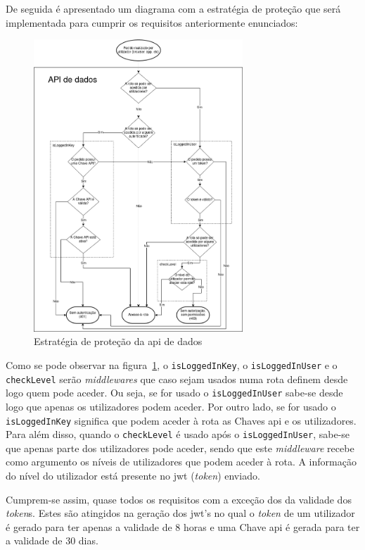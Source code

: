 De seguida é apresentado um diagrama com a estratégia de proteção que será implementada para cumprir os requisitos 
anteriormente enunciados:
\begin{figure}[H]
    \centering
    \includegraphics[width=0.7\textwidth]{img/protecaoStrag.png}
    \caption{Estratégia de proteção da \acrshort{api} de dados}\label{fig:protStrag}
\end{figure}

Como se pode observar na figura~\ref{fig:protStrag}, o \texttt{isLoggedInKey}, o \texttt{isLoggedInUser} e o \texttt{checkLevel} serão \textit{middlewares} que caso 
sejam usados numa rota definem desde logo quem pode aceder. 
Ou seja, se for usado o \texttt{isLoggedInUser} sabe-se desde logo que apenas os utilizadores podem aceder. 
Por outro lado, se for usado o \texttt{isLoggedInKey} significa que podem aceder à rota as Chaves \acrshort{api} e 
os utilizadores. Para além disso, quando o \texttt{checkLevel} é usado após o \texttt{isLoggedInUser}, sabe-se que 
apenas parte dos utilizadores pode aceder, sendo que este \textit{middleware} recebe como argumento os níveis de 
utilizadores que podem aceder à rota. A informação do nível do utilizador está presente no \acrshort{jwt} 
(\textit{token}) enviado.

Cumprem-se assim, quase todos os requisitos com a exceção dos da validade dos \textit{token}s. 
Estes são atingidos na geração dos \acrshort{jwt}'s no qual o \textit{token} de um utilizador é gerado para 
ter apenas a validade de 8 horas e uma Chave \acrshort{api} é gerada para ter a validade de 30 dias.

